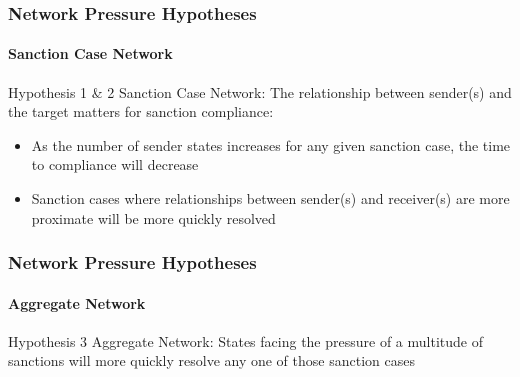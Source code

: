 
\begin{frame}
\frametitle{Network Pressure Hypotheses}
\framesubtitle{Sanction Case Network}

\begin{block}{Hypothesis 1 \& 2}
	Sanction Case Network: The relationship between sender(s) and the target matters for sanction compliance: 
\end{block}

\begin{itemize}
	\item As the number of sender states increases for any given sanction case, the time to compliance will decrease
	\item Sanction cases where relationships between sender(s) and receiver(s) are more proximate will be more quickly resolved
\end{itemize}

\end{frame}

\begin{frame}
\frametitle{Network Pressure Hypotheses}
\framesubtitle{Aggregate Network}

\begin{block}{Hypothesis 3}
	Aggregate Network: States facing the pressure of a multitude of sanctions will more quickly resolve any one of those sanction cases
\end{block}

\end{frame}

